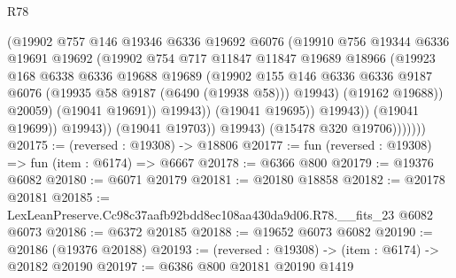 \begin{lexlean}{R78}
\begin{coremodule}
                                  (@19902
                                    @757
                                    @146
                                    @19346
                                    @6336
                                    @19692
                                    @6076
                                    (@19910
                                      @756
                                      @19344
                                      @6336
                                      @19691
                                      @19692
                                      (@19902
                                        @754
                                        @717
                                        @11847
                                        @11847
                                        @19689
                                        @18966
                                        (@19923
                                          @168
                                          @6338
                                          @6336
                                          @19688
                                          @19689
                                          (@19902
                                            @155
                                            @146
                                            @6336
                                            @6336
                                            @9187
                                            @6076
                                            (@19935 @58 @9187 (@6490 (@19938 @58)))
                                            @19943)
                                          (@19162 @19688))
                                        @20059)
                                      (@19041 @19691))
                                    @19943))
                                (@19041 @19695))
                              @19943))
                          (@19041 @19699))
                        @19943))
                    (@19041 @19703))
                  @19943)
                (@15478 @320 @19706)))))))
@20175 := (reversed : @19308) -> @18806
@20177 := fun (reversed : @19308) => fun (item : @6174) => @6667
@20178 := @6366 @800
@20179 := @19376 @6082
@20180 := @6071 @20179
@20181 := @20180 @18858
@20182 := @20178 @20181
@20185 := LexLeanPreserve.Cc98c37aafb92bdd8ec108aa430da9d06.R78.__fits_23 @6082 @6073
@20186 := @6372 @20185
@20188 := @19652 @6073 @6082
@20190 := @20186 (@19376 @20188)
@20193 := (reversed : @19308) -> (item : @6174) -> @20182 @20190
@20197 := @6386 @800 @20181 @20190 @1419

\end{coremodule}
\end{lexlean}
